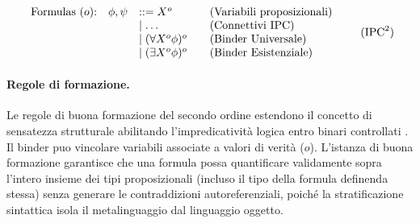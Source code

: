 \begin{equation}
    \begin{array}{lrll}
        \text{Formulas ($o$):}  & \phi, \psi & ::= X^o                   \quad  & \text{(Variabili proposizionali)} \\
                                &            & \mid \dots                \quad  & \text{(Connettivi IPC)}           \\
                                &            & \mid (\forall X^o \phi)^o \quad  & \text{(Binder Universale)}        \\
                                &            & \mid (\exists X^o \phi)^o \quad  & \text{(Binder Esistenziale)}
    \end{array}
    \tag{$\text{IPC}^2$}
    \label{eq:ipc2_grammar}
\end{equation}

\paragraph{Regole di formazione.}
Le regole di buona formazione del secondo ordine estendono il concetto di sensatezza strutturale abilitando l'impredicatività 
logica entro binari controllati \cite{hindley1997}. Il binder puo vincolare variabili associate a valori di verità ($o$). L'istanza 
di buona formazione garantisce che una formula possa quantificare validamente sopra l'intero insieme dei tipi proposizionali (incluso 
il tipo della formula definenda stessa) senza generare le contraddizioni autoreferenziali, poiché la stratificazione sintattica isola 
il metalinguaggio dal linguaggio oggetto.